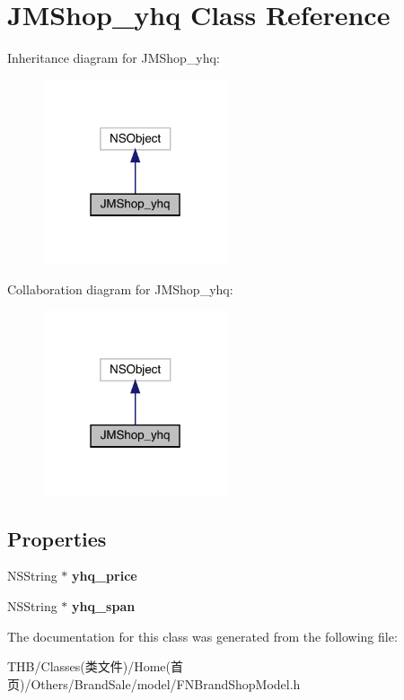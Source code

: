 \hypertarget{interface_j_m_shop__yhq}{}\section{J\+M\+Shop\+\_\+yhq Class Reference}
\label{interface_j_m_shop__yhq}


Inheritance diagram for J\+M\+Shop\+\_\+yhq\+:\nopagebreak
\begin{figure}[H]
\begin{center}
\leavevmode
\includegraphics[width=154pt]{interface_j_m_shop__yhq__inherit__graph}
\end{center}
\end{figure}


Collaboration diagram for J\+M\+Shop\+\_\+yhq\+:\nopagebreak
\begin{figure}[H]
\begin{center}
\leavevmode
\includegraphics[width=154pt]{interface_j_m_shop__yhq__coll__graph}
\end{center}
\end{figure}
\subsection*{Properties}
\begin{DoxyCompactItemize}
\item 
\mbox{\label{interface_j_m_shop__yhq_a5342bf73e3a08843764375e561bdb2c3}} 
N\+S\+String $\ast$ {\bfseries yhq\+\_\+price}
\item 
\mbox{\label{interface_j_m_shop__yhq_ad269d0646b497742f7340459eb627c27}} 
N\+S\+String $\ast$ {\bfseries yhq\+\_\+span}
\end{DoxyCompactItemize}


The documentation for this class was generated from the following file\+:\begin{DoxyCompactItemize}
\item 
T\+H\+B/\+Classes(类文件)/\+Home(首页)/\+Others/\+Brand\+Sale/model/F\+N\+Brand\+Shop\+Model.\+h\end{DoxyCompactItemize}
